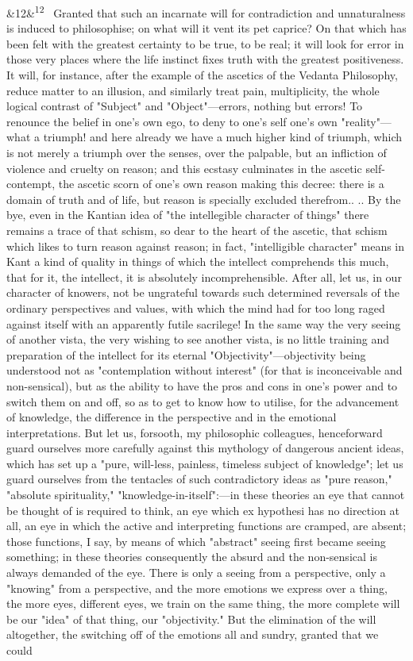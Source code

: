 \documentclass[12pt]{article}
\newcommand{\para}[1][]{\par\noindent\ifx&#1&\else\textsuperscript{\footnotesize #1}~\fi}
\begin{document}
\para[12] Granted that such an incarnate will for contradiction and unnaturalness is induced to philosophise; on what will it vent its pet caprice? On that which has been felt with the greatest certainty to be true, to be real; it will look for error in those very places where the life instinct fixes truth with the greatest positiveness. It will, for instance, after the example of the ascetics of the Vedanta Philosophy, reduce matter to an illusion, and similarly treat pain, multiplicity, the whole logical contrast of "Subject" and "Object"---errors, nothing but errors! To renounce the belief in one's own ego, to deny to one's self one's own "reality"---what a triumph! and here already we have a much higher kind of triumph, which is not merely a triumph over the senses, over the palpable, but an infliction of violence and cruelty on reason; and this ecstasy culminates in the ascetic self-contempt, the ascetic scorn of one's own reason making this decree: there is a domain of truth and of life, but reason is specially excluded therefrom.. .. By the bye, even in the Kantian idea of "the intellegible character of things" there remains a trace of that schism, so dear to the heart of the ascetic, that schism which likes to turn reason against reason; in fact, "intelligible character" means in Kant a kind of quality in things of which the intellect comprehends this much, that for it, the intellect, it is absolutely incomprehensible. After all, let us, in our character of knowers, not be ungrateful towards such determined reversals of the ordinary perspectives and values, with which the mind had for too long raged against itself with an apparently futile sacrilege! In the same way the very seeing of another vista, the very wishing to see another vista, is no little training and preparation of the intellect for its eternal "Objectivity"---objectivity being understood not as "contemplation without interest" (for that is inconceivable and non-sensical), but as the ability to have the pros and cons in one's power and to switch them on and off, so as to get to know how to utilise, for the advancement of knowledge, the difference in the perspective and in the emotional interpretations. But let us, forsooth, my philosophic colleagues, henceforward guard ourselves more carefully against this mythology of dangerous ancient ideas, which has set up a "pure, will-less, painless, timeless subject of knowledge"; let us guard ourselves from the tentacles of such contradictory ideas as "pure reason," "absolute spirituality," "knowledge-in-itself":---in these theories an eye that cannot be thought of is required to think, an eye which ex hypothesi has no direction at all, an eye in which the active and interpreting functions are cramped, are absent; those functions, I say, by means of which "abstract" seeing first became seeing something; in these theories consequently the absurd and the non-sensical is always demanded of the eye. There is only a seeing from a perspective, only a "knowing" from a perspective, and the more emotions we express over a thing, the more eyes, different eyes, we train on the same thing, the more complete will be our "idea" of that thing, our "objectivity." But the elimination of the will altogether, the switching off of the emotions all and sundry, granted that we could 
\end{document}
